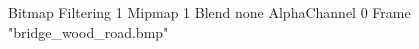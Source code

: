 {Bitmap
	{Filtering 1}
	{Mipmap 1}
	{Blend none}
	{AlphaChannel 0}
	{Frame "bridge_wood_road.bmp"}
}
